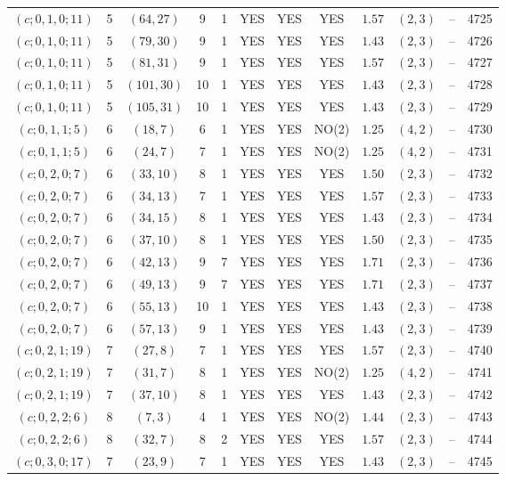 \begin{longtable}{|c|c|c|c|c|c|c|c|c|c|c|c|}
$(c;0,1,0;11)$ & 5 & $(64,27)$ & 9 & 1 & YES & YES & YES & $1.57$ & $(2,3)$ & -- & 4725\\
$(c;0,1,0;11)$ & 5 & $(79,30)$ & 9 & 1 & YES & YES & YES & $1.43$ & $(2,3)$ & -- & 4726\\
$(c;0,1,0;11)$ & 5 & $(81,31)$ & 9 & 1 & YES & YES & YES & $1.57$ & $(2,3)$ & -- & 4727\\
$(c;0,1,0;11)$ & 5 & $(101,30)$ & 10 & 1 & YES & YES & YES & $1.43$ & $(2,3)$ & -- & 4728\\
$(c;0,1,0;11)$ & 5 & $(105,31)$ & 10 & 1 & YES & YES & YES & $1.43$ & $(2,3)$ & -- & 4729\\
$(c;0,1,1;5)$ & 6 & $(18,7)$ & 6 & 1 & YES & YES & NO(2) & $1.25$ & $(4,2)$ & -- & 4730\\
$(c;0,1,1;5)$ & 6 & $(24,7)$ & 7 & 1 & YES & YES & NO(2) & $1.25$ & $(4,2)$ & -- & 4731\\
$(c;0,2,0;7)$ & 6 & $(33,10)$ & 8 & 1 & YES & YES & YES & $1.50$ & $(2,3)$ & -- & 4732\\
$(c;0,2,0;7)$ & 6 & $(34,13)$ & 7 & 1 & YES & YES & YES & $1.57$ & $(2,3)$ & -- & 4733\\
$(c;0,2,0;7)$ & 6 & $(34,15)$ & 8 & 1 & YES & YES & YES & $1.43$ & $(2,3)$ & -- & 4734\\
$(c;0,2,0;7)$ & 6 & $(37,10)$ & 8 & 1 & YES & YES & YES & $1.50$ & $(2,3)$ & -- & 4735\\
$(c;0,2,0;7)$ & 6 & $(42,13)$ & 9 & 7 & YES & YES & YES & $1.71$ & $(2,3)$ & -- & 4736\\
$(c;0,2,0;7)$ & 6 & $(49,13)$ & 9 & 7 & YES & YES & YES & $1.71$ & $(2,3)$ & -- & 4737\\
$(c;0,2,0;7)$ & 6 & $(55,13)$ & 10 & 1 & YES & YES & YES & $1.43$ & $(2,3)$ & -- & 4738\\
$(c;0,2,0;7)$ & 6 & $(57,13)$ & 9 & 1 & YES & YES & YES & $1.43$ & $(2,3)$ & -- & 4739\\
$(c;0,2,1;19)$ & 7 & $(27,8)$ & 7 & 1 & YES & YES & YES & $1.57$ & $(2,3)$ & -- & 4740\\
$(c;0,2,1;19)$ & 7 & $(31,7)$ & 8 & 1 & YES & YES & NO(2) & $1.25$ & $(4,2)$ & -- & 4741\\
$(c;0,2,1;19)$ & 7 & $(37,10)$ & 8 & 1 & YES & YES & YES & $1.43$ & $(2,3)$ & -- & 4742\\
$(c;0,2,2;6)$ & 8 & $(7,3)$ & 4 & 1 & YES & YES & NO(2) & $1.44$ & $(2,3)$ & -- & 4743\\
$(c;0,2,2;6)$ & 8 & $(32,7)$ & 8 & 2 & YES & YES & YES & $1.57$ & $(2,3)$ & -- & 4744\\
$(c;0,3,0;17)$ & 7 & $(23,9)$ & 7 & 1 & YES & YES & YES & $1.43$ & $(2,3)$ & -- & 4745\\

\end{longtable}
